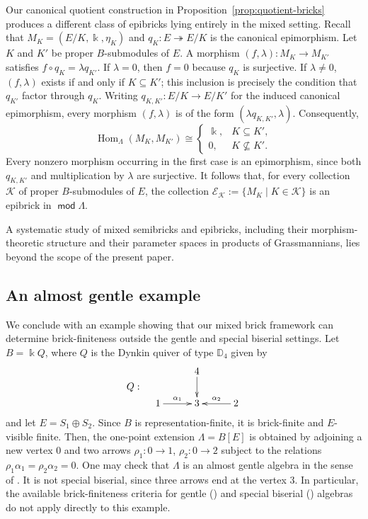 \documentclass[a4,12pt]{amsart}
\numberwithin{equation}{section} %
\def\Hom{\operatorname{Hom}} %
\def\mod{\operatorname{\mathsf{mod}}}
\theoremstyle{definition} %
\begin{document}
Our canonical quotient construction in Proposition~\ref{prop:quotient-bricks} produces a different class of epibricks lying entirely in the mixed setting. Recall that $M_K=(E/K,\Bbbk,\eta_K)$ and $q_K\colon E\twoheadrightarrow E/K$ is the canonical epimorphism. Let $K$ and $K'$ be proper $B$-submodules of $E$. A morphism $(f,\lambda):M_K\rightarrow M_{K'}$ satisfies $f \circ q_K=\lambda q_{K'}$. If $\lambda=0$, then $f=0$ because $q_K$ is surjective. If
$\lambda\neq0$, $(f,\lambda)$ exists if and only if $K\subseteq K'$; this inclusion is precisely the condition that $q_{K'}$
factor through $q_K$. Writing $q_{K,K'}:E/K\rightarrow E/K'$ for the induced canonical epimorphism, every morphism $(f,\lambda)$ is of the form $(\lambda q_{K,K'},\lambda)$. Consequently,
\[
\Hom_\Lambda(M_K,M_{K'})
\cong
\begin{cases}
\Bbbk, & K\subseteq K',\\
0, & K\not\subseteq K'.
\end{cases}
\]
Every nonzero morphism occurring in the first case is an epimorphism,
since both $q_{K,K'}$ and multiplication by $\lambda$ are surjective. It follows that, for every collection $\mathcal{K}$ of proper
$B$-submodules of $E$, the collection $\mathcal{E}_{\mathcal{K}} := \{M_K\mid K\in\mathcal{K}\}$ is an epibrick in $\mod \Lambda$. 

A systematic study of mixed semibricks and epibricks, including their
morphism-theoretic structure and their parameter spaces in products
of Grassmannians, lies beyond the scope of the present paper.

\subsection{An almost gentle example}
We conclude with an example showing that our mixed brick framework can determine brick-finiteness outside the gentle and special biserial settings. Let $B=\Bbbk Q$, where $Q$ is the Dynkin quiver of type
$\mathbb{D}_4$ given by
\[
Q:\quad \vcenter{\xymatrix@C=1cm@R=0.7cm{&4\ar[d]&\\1\ar[r]^{\alpha_1}&3&2\ar[l]_{\alpha_2}}}
\]
and let $E=S_1\oplus S_2$. Since $B$ is representation-finite, it is brick-finite and $E$-visible finite. Then, the one-point extension $\Lambda=B[E]$ is obtained by adjoining a new vertex $0$ and two arrows $\rho_1\colon 0\rightarrow1$,  $\rho_2\colon 0\rightarrow2$ subject to the relations $\rho_1\alpha_1=\rho_2\alpha_2=0$. One may check that $\Lambda$ is an almost gentle algebra in the sense of \cite{GS-almost-gentle}. It is not special biserial, since three arrows end at the vertex $3$. In particular, the available brick-finiteness
criteria for gentle (\cite{Plamondon-gentle}) and special biserial (\cite{Schroll-Treffinger-Valdivieso-band}) algebras do not apply directly to this example.
\end{document}
